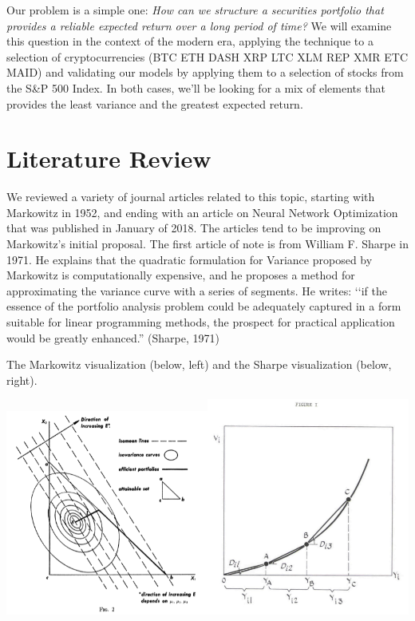 \documentclass[11pt]{article} %
\begin{document}
Our problem is a simple one:\emph{ How can we structure a securities portfolio that provides a reliable expected return over a long period of time?} We will examine this question in the context of the modern era, applying the technique to a selection of cryptocurrencies (BTC ETH DASH XRP LTC XLM REP XMR ETC MAID) and validating our models by applying them to a selection of stocks from the S\&P 500 Index. In both cases, we’ll be looking for a mix of elements that provides the least variance and the greatest expected return. 

\section{Literature Review}

We reviewed a variety of journal articles related to this topic, starting with Markowitz in 1952, and ending with an article on Neural Network Optimization that was published in January of 2018. The articles tend to be improving on Markowitz’s initial proposal. The first article of note is from William F. Sharpe in 1971. He explains that the quadratic formulation for Variance proposed by Markowitz is computationally expensive, and he proposes a method for approximating the variance curve with a series of segments. He writes: ‘‘if the essence of the portfolio analysis problem could be adequately captured in a form suitable for linear programming methods, the prospect for practical application would be greatly enhanced.” (Sharpe, 1971)

The Markowitz visualization (below, left) and the Sharpe visualization (below, right).

\includegraphics[width=0.5\textwidth]{mark1}\includegraphics[width=0.5\textwidth]{sharpe1}
    
\end{document}
